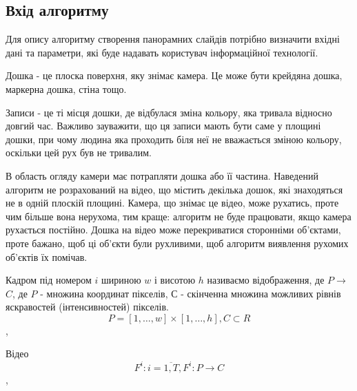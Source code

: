 \subsection*{Вхід алгоритму}

Для опису алгоритму створення панорамних слайдів потрібно визначити 
вхідні дані та параметри, які буде надавать користувач інформаційної
технології.


Дошка - це плоска поверхня, яку знімає камера. Це може бути крейдяна 
дошка, маркерна дошка, стіна тощо.

Записи - це ті місця дошки, де відбулася зміна кольору, яка тривала 
відносно довгий час. Важливо зауважити, що ця записи мають бути 
саме у площині дошки, при чому людина яка проходить біля неї не вважається
зміною кольору, оскільки цей рух був не тривалим.

В область огляду камери має потрапляти дошка або її частина. Наведений 
алгоритм не розрахований на відео, що містить декілька дошок, які знаходяться
не в одній плоскій площині. Камера, що знімає це відео, може рухатись, проте 
чим більше вона нерухома, тим краще: алгоритм не буде працювати, якщо камера 
рухається постійно. Дошка на відео може перекриватися сторонніми об’єктами, 
проте бажано, щоб ці об’єкти були рухливими, щоб алгоритм виявлення рухомих 
об’єктів їх помічав.

Кадром під номером $i$ шириною $w$ і висотою $h$ називаємо відображення, де 
$P$$\to$$C$, де $P$ - множина координат пікселів, $С$ - скінченна множина можливих рівнів
яскравостей (інтенсивностей) пікселів.
\begin{equation}
    P = [1, \ldots ,w]\times[1, \ldots, h], C \subset R
\end{equation},


Відео
\begin{equation}
    F^i: i = \overline{1,T},  F^i: P \to C
\end{equation},